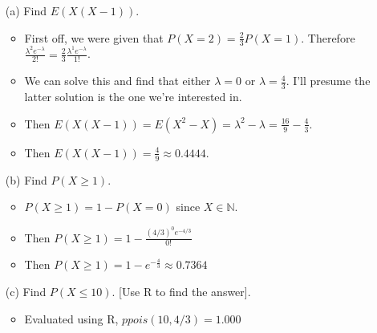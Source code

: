 \documentclass{article}
\begin{document}
\begin{enumerate}
    \begin{enumerate}
    \item [(a)] Find $E(X(X-1))$.
        \begin{itemize}
        \item First off, we were given that $P(X=2)=\frac{2}{3}P(X=1)$. Therefore $\frac{\lambda^2 e^{-\lambda}}{2!}=\frac{2}{3}\frac{\lambda^1 e^{-\lambda}}{1!}$.
        \item We can solve this and find that either $\lambda = 0$ or $\lambda = \frac{4}{3}$. I'll presume the latter solution is the one we're interested in.
        \item Then $E(X(X-1)) = E(X^2 - X) = \lambda^2 - \lambda = \frac{16}{9} - \frac{4}{3}$.
        \item Then $E(X(X-1)) = \frac{4}{9} \approx 0.4444$.
        \end{itemize}
    \item [(b)] Find $P(X \ge 1)$.
        \begin{itemize}
        \item $P(X \ge 1) = 1 - P(X = 0)$ since $X \in \mathbb{N}$.
        \item Then $P(X \ge 1) = 1 - \frac{(4/3)^0 e^{-4/3}}{0!}$
        \item Then $P(X \ge 1) = 1 - e^{-\frac{4}{3}} \approx 0.7364$
        \end{itemize}
    \item [(c)] Find $P(X \le 10)$. [Use R to find the answer].
        \begin{itemize}
        \item Evaluated using R, $ppois(10, 4/3) = 1.000$
        \end{itemize}
    \end{enumerate}
\end{enumerate}
\end{document}
